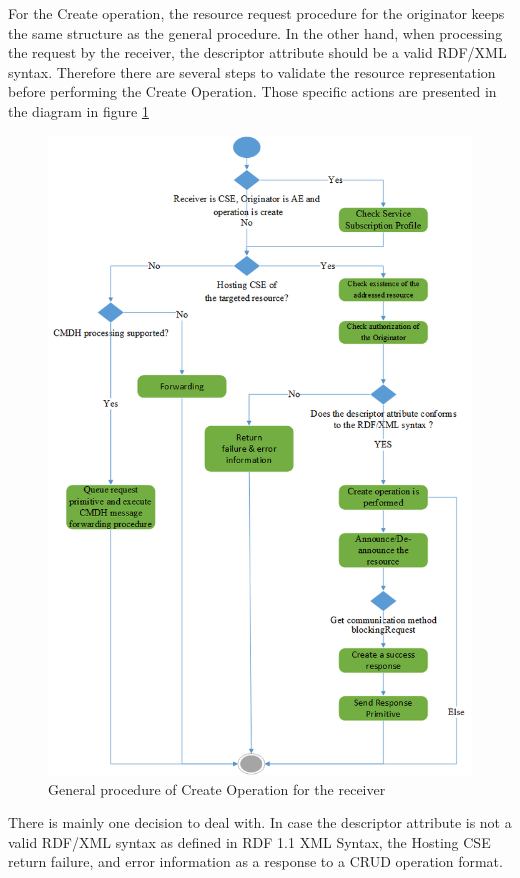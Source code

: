For the Create operation, the resource request procedure for the originator keeps the same structure as the general procedure.
In the other hand, when processing the request by the receiver, the descriptor attribute should be a valid RDF/XML syntax. Therefore there are several steps to validate the resource representation before performing the Create Operation. Those specific actions are presented in the diagram in figure \ref{fig:contrib1:create} 
\begin{figure}[htbp]
    \centering
    \includegraphics[width=1\textwidth]{resources/images/create}
    \caption{General procedure of Create Operation for the receiver }\label{fig:contrib1:create}
\end{figure}
There is mainly one decision to deal with. In case the descriptor attribute is not a valid RDF/XML syntax as defined in RDF 1.1 XML Syntax, the Hosting CSE return failure, and error information as a response to a CRUD operation format.
